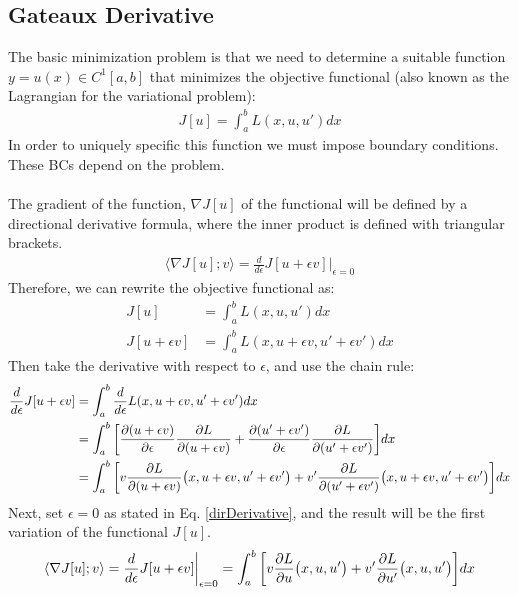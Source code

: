 \documentclass[12pt,3p]{article}
\numberwithin{equation}{section}
\begin{document}
\subsection{Gateaux Derivative}\label{App:Gateaux}
The basic minimization problem is that we need to determine a suitable function $y = u(x) \in C^1 [a,b]$ that minimizes the objective functional (also known as the Lagrangian for the variational problem):
\begin{align}\label{objFunctional}
    J[u] = \int_a^b L(x,u, u') dx
\end{align}
In order to uniquely specific this function we must impose boundary conditions. These BCs depend on the problem. \\ \\
The gradient of the function, $\nabla J[u]$ of the functional will be defined by a directional derivative formula, where the inner product is defined with triangular brackets. 
\begin{align}\label{dirDerivative}
\langle \nabla J[u]; v\rangle = \frac{d}{d \epsilon} J[u+ \epsilon v] \bigg\rvert_{\epsilon = 0}   
\end{align}
Therefore, we can rewrite the objective functional as:
\begin{align*}
J[u] &= \int_a^b L(x,u, u') dx \\
J[u+\epsilon v] &= \int_a^b L(x,u+ \epsilon v, u' + \epsilon v') dx
\end{align*}
Then take the derivative with respect to $\epsilon$, and use the chain rule:
\begin{align*}
\frac{d}{d \epsilon} J[u+\epsilon v] &= \int_a^b \frac{d}{d \epsilon} L(x,u+ \epsilon v, u' + \epsilon v') dx \\
                                    &= \int_a^b \bigg[ \pdv{(u+ \epsilon v)}{\epsilon} \pdv{L}{(u + \epsilon v)} + \pdv{(u' + \epsilon v')}{\epsilon} \pdv{L}{(u' + \epsilon v')} \bigg] dx \\
                                    &= \int_a^b \bigg[ v \pdv{L}{(u + \epsilon v)} \big( x, u+ \epsilon v, u' + \epsilon v' \big) + v' \pdv{L}{(u'+\epsilon v')} \big( x, u+ \epsilon v, u' + \epsilon v' \big) \bigg] dx
\end{align*}
Next, set $\epsilon = 0$ as stated in Eq. \ref{dirDerivative}, and the result will be the first variation of the functional $J[u]$. 
\begin{align}\label{befIntParts}
\langle \nabla J[u]; v\rangle = \frac{d}{d \epsilon} J[u+ \epsilon v] \bigg\rvert_{\epsilon = 0} = \int_a^b \bigg[ v \pdv{L}{u} \big(x, u, u' \big) + v' \pdv{L}{u'} \big( x, u, u' \big) \bigg] dx 
\end{align}
\end{document}
